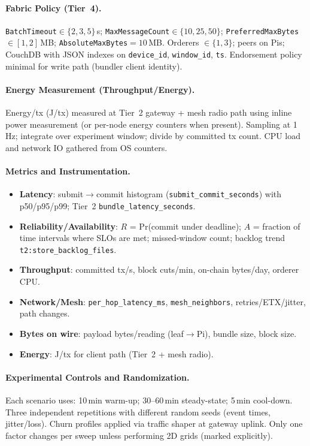 \documentclass[12pt,onecolumn]{IEEEtran} %
\begin{document}
\paragraph{Fabric Policy (Tier~4).}
\texttt{BatchTimeout}$\in\{2,3,5\}$\,s; \texttt{MaxMessageCount}$\in\{10,25,50\}$; \texttt{PreferredMaxBytes}$\in[1,2]$\,MB; \texttt{AbsoluteMaxBytes}$=10$\,MB. Orderers $\in\{1,3\}$; peers on Pis; CouchDB with JSON indexes on \texttt{device\_id}, \texttt{window\_id}, \texttt{ts}. Endorsement policy minimal for write path (bundler client identity). 

\paragraph{Energy Measurement (Throughput/Energy).}
Energy/tx (J/tx) measured at Tier~2 gateway + mesh radio path using inline power measurement (or per-node energy counters when present). Sampling at 1\,Hz; integrate over experiment window; divide by committed tx count. CPU load and network IO gathered from OS counters.

\paragraph{Metrics and Instrumentation.}
\begin{itemize}[leftmargin=*, itemsep=0.1em]
  \item \textbf{Latency}: submit$\to$commit histogram (\texttt{submit\_commit\_seconds}) with p50/p95/p99; Tier~2 \texttt{bundle\_latency\_seconds}.
  \item \textbf{Reliability/Availability}: $R$ = Pr(commit under deadline); $A$ = fraction of time intervals where SLOs are met; missed-window count; backlog trend \texttt{t2:store\_backlog\_files}.
  \item \textbf{Throughput}: committed tx/s, block cuts/min, on-chain bytes/day, orderer CPU.
  \item \textbf{Network/Mesh}: \texttt{per\_hop\_latency\_ms}, \texttt{mesh\_neighbors}, retries/ETX/jitter, path changes.
  \item \textbf{Bytes on wire}: payload bytes/reading (leaf$\to$Pi), bundle size, block size.
  \item \textbf{Energy}: J/tx for client path (Tier~2 + mesh radio).
\end{itemize}

\paragraph{Experimental Controls and Randomization.}
Each scenario uses: 10\,min warm-up; 30--60\,min steady-state; 5\,min cool-down. Three independent repetitions with different random seeds (event times, jitter/loss). Churn profiles applied via traffic shaper at gateway uplink. Only one factor changes per sweep unless performing 2D grids (marked explicitly).
\end{document}
